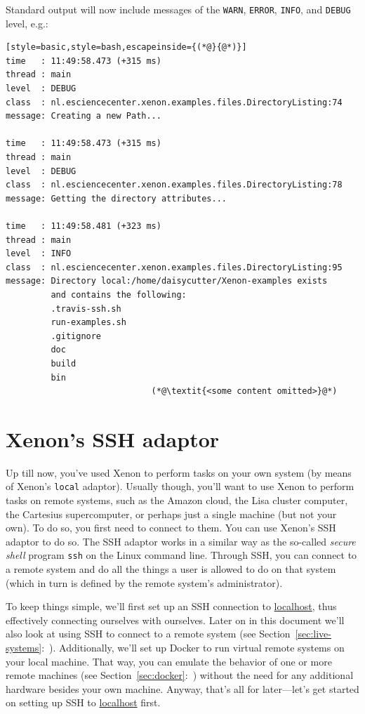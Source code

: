 \documentclass[12pt, a4paper, twoside, openany, titlepage]{book}
\begin{document}
Standard output will now include messages of the \texttt{WARN}, \texttt{ERROR}, \texttt{INFO}, and \texttt{DEBUG} level, e.g.:
\begin{lstlisting}[style=basic,style=bash,escapeinside={(*@}{@*)}]
time   : 11:49:58.473 (+315 ms)
thread : main
level  : DEBUG
class  : nl.esciencecenter.xenon.examples.files.DirectoryListing:74
message: Creating a new Path...

time   : 11:49:58.473 (+315 ms)
thread : main
level  : DEBUG
class  : nl.esciencecenter.xenon.examples.files.DirectoryListing:78
message: Getting the directory attributes...

time   : 11:49:58.481 (+323 ms)
thread : main
level  : INFO
class  : nl.esciencecenter.xenon.examples.files.DirectoryListing:95
message: Directory local:/home/daisycutter/Xenon-examples exists
         and contains the following:
         .travis-ssh.sh
         run-examples.sh
         .gitignore
         doc
         build
         bin
                             (*@\textit{<some content omitted>}@*)
\end{lstlisting}



\section{Xenon's SSH adaptor}

Up till now, you've used Xenon to perform tasks on your own system (by means of Xenon's \texttt{local} adaptor). Usually though, you'll want to use Xenon to perform tasks on remote systems, such as the Amazon cloud, the Lisa cluster computer, the Cartesius supercomputer, or perhaps just a single machine (but not your own). To do so, you first need to connect to them. You can use Xenon's SSH adaptor to do so. The SSH adaptor works in a similar way as the so-called \textit{secure shell} program \texttt{ssh} on the Linux command line. Through SSH, you can connect to a remote system and do all the things a user is allowed to do on that system (which in turn is defined by the remote system's administrator).

To keep things simple, we'll first set up an SSH connection to \url{localhost}, thus effectively connecting ourselves with ourselves. Later on in this document we'll also look at using SSH to connect to a remote system (see Section~\ref{sec:live-systems}:~\textit{}). Additionally, we'll set up Docker to run virtual remote systems on your local machine. That way, you can emulate the behavior of one or more remote machines (see Section~\ref{sec:docker}:~\textit{}) without the need for any additional hardware besides your own machine. Anyway, that's all for later---let's get started on setting up SSH to \url{localhost} first.
\end{document}
